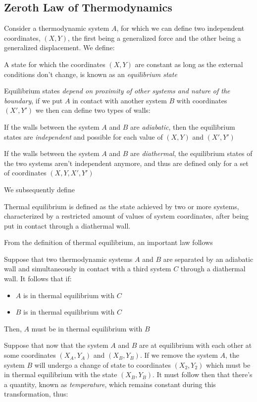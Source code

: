 \documentclass[../qm.tex]{subfiles}
\begin{document}
\subsection{Zeroth Law of Thermodynamics}
Consider a thermodynamic system $A$, for which we can define two independent coordinates, $(X, Y)$, the first being a generalized force and the other being a generalized displacement. We define:
\begin{dfn}
	A state for which the coordinates $(X, Y)$ are constant as long as the external conditions don't change, is known as an \textit{equilibrium state}
\end{dfn}
Equilibrium states \textit{depend on proximity of other systems and nature of the boundary}, if we put $A$ in contact with another system $B$ with coordinates $(X', Y')$ we then can define two types of walls:
\begin{dfn}
	If the walls between the system $A$ and $B$ are \textit{adiabatic}, then the equilibrium states are \textit{independent} and possible for each value of $(X, Y)$ and $(X', Y')$
\end{dfn}
\begin{dfn}
	If the walls between the system $A$ and $B$ are \textit{diathermal}, the equilibrium states of the two systems aren't independent anymore, and thus are defined only for a set of coordinates $(X, Y, X', Y')$
\end{dfn}
We subsequently define 
\begin{dfn}
	Thermal equilibrium is defined as the state achieved by two or more systems, characterized by a restricted amount of values of system coordinates, after being put in contact through a diathermal wall.
\end{dfn}
From the definition of thermal equilibrium, an important law follows
\begin{law}
	Suppose that two thermodynamic systems $A$ and $B$ are separated by an adiabatic wall and simultaneously in contact with a third system $C$ through a diathermal wall. It follows that if:
	\begin{itemize}
	\item $A$ is in thermal equilibrium with $C$
	\item $B$ is in thermal equilibrium with $C$
	\end{itemize}
	Then, $A$ must be in thermal equilibrium with $B$
\end{law}
Suppose that now that the system $A$ and $B$ are at equilibrium with each other at some coordinates $(X_A, Y_A)$ and $(X_B, Y_B)$. If we remove the system $A$, the system $B$ will undergo a change of state to coordinates $(X_2, Y_2)$ which must be in thermal equilibrium with the state $(X_B, Y_B)$. It must follow then that there's a quantity, known as \textit{temperature}, which remains constant during this transformation, thus:
\end{document}

